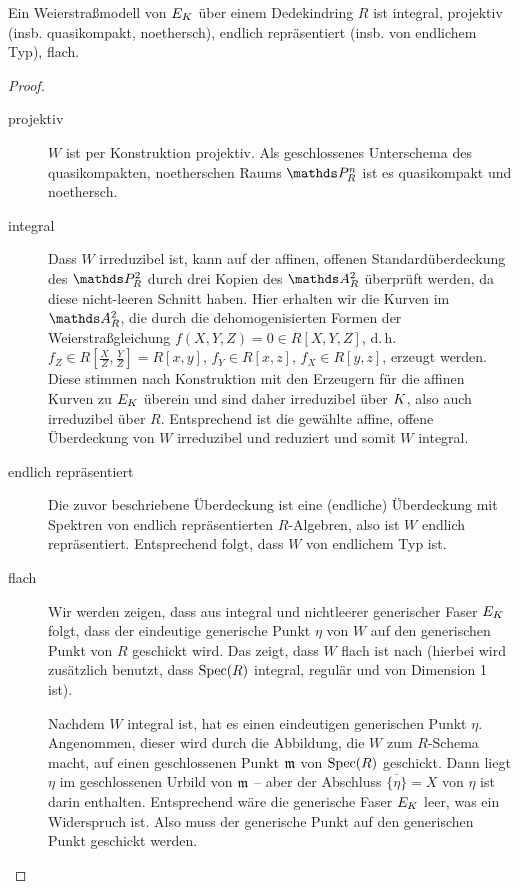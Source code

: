 \documentclass[german]{scrreprt}
\begin{document}
\begin{Lemma}\label{thm:eigweierstrassmodelle}
  Ein Weierstraßmodell von $E_{K}$ über einem Dedekindring $R$ ist
  integral,
  projektiv (insb. quasikompakt, noethersch),
  endlich repräsentiert (insb. von endlichem Typ),
  flach.
  \begin{proof}
    \begin{description}
    \item[projektiv] $W$ ist per Konstruktion projektiv. Als
      geschlossenes Unterschema des quasikompakten, noetherschen Raums
      $\P_R^n$ ist es quasikompakt und noethersch.
    \item[integral]
      Dass $W$ irreduzibel ist, kann auf der affinen, offenen
      Standardüberdeckung des $\P_R^2$ durch drei Kopien des $\A_R^2$
      überprüft werden, da diese nicht-leeren Schnitt haben. Hier
      erhalten wir die Kurven im $\A_R^2$, die durch die
      dehomogenisierten Formen der Weierstraßgleichung $f(X,Y,Z)=0\in
      R[X,Y,Z]$, d.\,h. $f_Z\in R[\frac{X}{Z},\frac{Y}{Z}]=R[x,y]$,
      $f_Y\in R[x,z]$, $f_X\in R[y,z]$, erzeugt werden.
      Diese stimmen nach Konstruktion mit den Erzeugern für die affinen
      Kurven zu $E_{K}$ überein und sind daher irreduzibel über $K$,
      also auch irreduzibel über $R$.
      Entsprechend ist die gewählte affine, offene Überdeckung von $W$
      irreduzibel und reduziert und somit $W$ integral.
    \item[endlich repräsentiert]
      Die zuvor beschriebene Überdeckung ist eine (endliche)
      Überdeckung mit Spektren von endlich repräsentierten $R$-Algebren,
      also ist $W$ endlich repräsentiert.
      Entsprechend folgt, dass $W$ von endlichem Typ ist.
    \item[flach]
      Wir werden zeigen, dass aus integral und nichtleerer generischer
      Faser $E_{K}$ folgt, dass der eindeutige generische Punkt $\eta$
      von $W$ auf den generischen Punkt von $R$ geschickt wird.
      Das zeigt, dass $W$ flach ist
      nach \cite[Proposition III.9.7]{hartshorne}
      (hierbei wird zusätzlich benutzt, dass $\operatorname{Spec}(R)$ integral,
      regulär und von Dimension 1 ist).
      
      Nachdem $W$ integral ist, hat es einen eindeutigen generischen
      Punkt $\eta$.
      Angenommen, dieser wird durch die Abbildung, die $W$ zum
      $R$-Schema macht, auf einen geschlossenen Punkt $\mathfrak{m}$ von $\operatorname{Spec}(R)$
      geschickt.
      Dann liegt $\eta$ im geschlossenen Urbild von $\mathfrak{m}$ –
      aber der Abschluss $\overline{\{\eta\}}=X$ von $\eta$ ist darin
      enthalten. Entsprechend wäre die generische Faser $E_{K}$
      leer, was ein Widerspruch ist.
      Also muss der generische Punkt auf den generischen Punkt geschickt
      werden.
    \end{description}
  \end{proof}
\end{Lemma}
\end{document}
